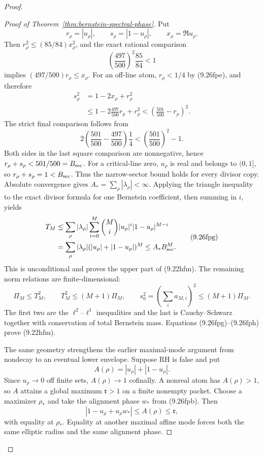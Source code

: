 \documentclass[11pt]{article}
\begin{document}
\begin{proof}
\begin{proof}[Proof of Theorem~\ref{thm:bernstein-spectral-phase}]
Put
\[
 r_\rho=|u_\rho|,\qquad s_\rho=|1-u_\rho|,
 \qquad x_\rho=\Re u_\rho.
\]
Then $r_\rho^2\le(85/84)x_\rho^2$, and the exact rational comparison
\[
 \left(\frac{497}{500}\right)^2\frac{85}{84}<1
\]
implies $(497/500)r_\rho\le x_\rho$.  For an off-line atom, $r_\rho<1/4$ by
\textup{(9.26fpe)}, and therefore
\[
 \begin{aligned}
 s_\rho^2
 &=1-2x_\rho+r_\rho^2\\
 &\le1-2\frac{497}{500}r_\rho+r_\rho^2
 <\left(\frac{501}{500}-r_\rho\right)^2.
 \end{aligned}
 \tag{9.26fpfa}
\]
The strict final comparison follows from
\[
 2\left(\frac{501}{500}-\frac{497}{500}\right)\frac14
 <\left(\frac{501}{500}\right)^2-1.
\]
Both sides in the last square comparison are nonnegative, hence
$r_\rho+s_\rho<501/500=B_{\rm sec}$.  For a critical-line zero, $u_\rho$ is real and belongs
to $(0,1]$, so $r_\rho+s_\rho=1<B_{\rm sec}$.  Thus the narrow-sector bound holds for every
divisor copy.  Absolute convergence gives
$A_*=\sum_\rho|\lambda_\rho|<\infty$.  Applying the triangle inequality to the exact divisor
formula for one Bernstein coefficient, then summing in $i$, yields
\[
 \begin{aligned}
 T_M
 &\le\sum_\rho|\lambda_\rho|
   \sum_{i=0}^M\binom Mi|u_\rho|^i|1-u_\rho|^{M-i}\\
 &=\sum_\rho|\lambda_\rho|
   (|u_\rho|+|1-u_\rho|)^M
 \le A_*B_{\rm sec}^M.
 \end{aligned}
 \tag{9.26fpg}
\]
This is unconditional and proves the upper part of \textup{(9.22hfm)}.  The remaining norm
relations are finite-dimensional:
\[
 \Pi_M\le T_M^2,
 \qquad
 T_M^2\le(M+1)\Pi_M,
 \qquad
 s_0^2=\left(\sum_i a_{M,i}\right)^2\le(M+1)\Pi_M.
 \tag{9.26fph}
\]
The first two are the $\ell^2$--$\ell^1$ inequalities and the last is Cauchy--Schwarz together
with conservation of total Bernstein mass.  Equations \textup{(9.26fpg)}--\textup{(9.26fph)}
prove \textup{(9.22hfm)}.

The same geometry strengthens the earlier maximal-mode argument from nondecay to an eventual
lower envelope.  Suppose RH is false and put
\[
 A(\rho)=|u_\rho|+|1-u_\rho|.
\]
Since $u_\rho\to0$ off finite sets, $A(\rho)\to1$ cofinally.  A nonreal atom has
$A(\rho)>1$, so $A$ attains a global maximum $\mathfrak r>1$ on a finite nonempty packet.
Choose a maximizer $\rho_*$ and take the alignment phase $w_*$ from
\textup{(9.26fpb)}.  Then
\[
 |1-u_\rho+u_\rho w_*|\le A(\rho)\le\mathfrak r,
\]
with equality at $\rho_*$.  Equality at another maximal affine mode forces both the same
elliptic radius and the same alignment phase.


\end{proof}
\end{proof}
\end{document}
